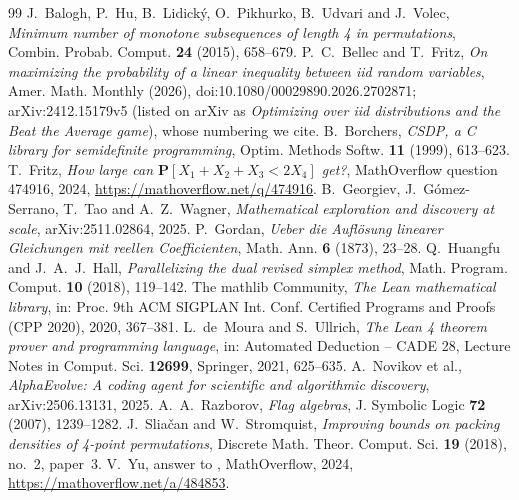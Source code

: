 \documentclass[11pt]{amsart}
\theoremstyle{definition}
\theoremstyle{remark}
\numberwithin{equation}{section}
\begin{document}
\begin{thebibliography}{99}
 J.~Balogh, P.~Hu, B.~Lidick\'y, O.~Pikhurko, B.~Udvari and J.~Volec, \emph{Minimum number of monotone subsequences of length 4 in permutations}, Combin. Probab. Comput. \textbf{24} (2015), 658--679.
 P.~C.~Bellec and T.~Fritz, \emph{On maximizing the probability of a linear inequality between iid random variables}, Amer. Math. Monthly (2026), doi:10.1080/00029890.2026.2702871; arXiv:2412.15179v5 (listed on arXiv as \emph{Optimizing over iid distributions and the Beat the Average game}), whose numbering we cite.
 B.~Borchers, \emph{CSDP, a C library for semidefinite programming}, Optim. Methods Softw. \textbf{11} (1999), 613--623.
 T.~Fritz, \emph{How large can $\mathbf{P}[X_1+X_2+X_3<2X_4]$ get?}, MathOverflow question 474916, 2024, \url{https://mathoverflow.net/q/474916}.
 B.~Georgiev, J.~G\'omez-Serrano, T.~Tao and A.~Z.~Wagner, \emph{Mathematical exploration and discovery at scale}, arXiv:2511.02864, 2025.
 P.~Gordan, \emph{Ueber die Aufl\"osung linearer Gleichungen mit reellen Coefficienten}, Math. Ann. \textbf{6} (1873), 23--28.
 Q.~Huangfu and J.~A.~J.~Hall, \emph{Parallelizing the dual revised simplex method}, Math. Program. Comput. \textbf{10} (2018), 119--142.
 The mathlib Community, \emph{The Lean mathematical library}, in: Proc. 9th ACM SIGPLAN Int. Conf. Certified Programs and Proofs (CPP 2020), 2020, 367--381.
 L.~de~Moura and S.~Ullrich, \emph{The Lean 4 theorem prover and programming language}, in: Automated Deduction -- CADE 28, Lecture Notes in Comput. Sci. \textbf{12699}, Springer, 2021, 625--635.
 A.~Novikov et al., \emph{AlphaEvolve: A coding agent for scientific and algorithmic discovery}, arXiv:2506.13131, 2025.
 A.~A.~Razborov, \emph{Flag algebras}, J. Symbolic Logic \textbf{72} (2007), 1239--1282.
 J.~Slia\v{c}an and W.~Stromquist, \emph{Improving bounds on packing densities of 4-point permutations}, Discrete Math. Theor. Comput. Sci. \textbf{19} (2018), no.~2, paper~3.
 V.~Yu, answer to \cite{Fri24}, MathOverflow, 2024, \url{https://mathoverflow.net/a/484853}.
\end{thebibliography}
\end{document}
